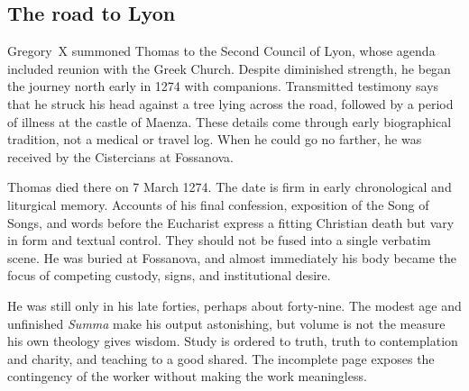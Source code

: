 \subsection{The road to Lyon}

Gregory~X summoned Thomas to the Second Council of Lyon, whose agenda included
reunion with the Greek Church.  Despite diminished strength, he began the
journey north early in 1274 with companions.  Transmitted testimony says that
he struck his head against a tree lying across the road, followed by a period
of illness at the castle of Maenza.  These details come through early biographical
tradition, not a medical or travel log.  When he could go no farther, he was
received by the Cistercians at Fossanova.

Thomas died there on 7 March 1274.  The date is firm in early chronological and
liturgical memory.  Accounts of his final confession, exposition of the Song
of Songs, and words before the Eucharist express a fitting Christian death but
vary in form and textual control.  They should not be fused into a single
verbatim scene.  He was buried at Fossanova, and almost immediately his body
became the focus of competing custody, signs, and institutional desire.

He was still only in his late forties, perhaps about forty-nine.  The modest
age and unfinished \emph{Summa} make his output astonishing, but volume is not
the measure his own theology gives wisdom.  Study is ordered to truth, truth to
contemplation and charity, and teaching to a good shared.  The incomplete page
exposes the contingency of the worker without making the work meaningless.

